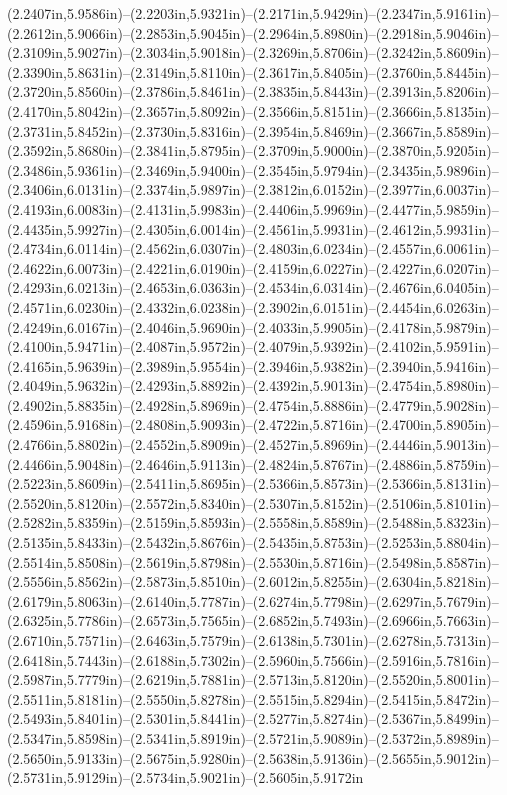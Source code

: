 (2.2407in,5.9586in)--(2.2203in,5.9321in)--(2.2171in,5.9429in)--(2.2347in,5.9161in)--(2.2612in,5.9066in)--(2.2853in,5.9045in)--(2.2964in,5.8980in)--(2.2918in,5.9046in)--(2.3109in,5.9027in)--(2.3034in,5.9018in)--(2.3269in,5.8706in)--(2.3242in,5.8609in)--(2.3390in,5.8631in)--(2.3149in,5.8110in)--(2.3617in,5.8405in)--(2.3760in,5.8445in)--(2.3720in,5.8560in)--(2.3786in,5.8461in)--(2.3835in,5.8443in)--(2.3913in,5.8206in)--(2.4170in,5.8042in)--(2.3657in,5.8092in)--(2.3566in,5.8151in)--(2.3666in,5.8135in)--(2.3731in,5.8452in)--(2.3730in,5.8316in)--(2.3954in,5.8469in)--(2.3667in,5.8589in)--(2.3592in,5.8680in)--(2.3841in,5.8795in)--(2.3709in,5.9000in)--(2.3870in,5.9205in)--(2.3486in,5.9361in)--(2.3469in,5.9400in)--(2.3545in,5.9794in)--(2.3435in,5.9896in)--(2.3406in,6.0131in)--(2.3374in,5.9897in)--(2.3812in,6.0152in)--(2.3977in,6.0037in)--(2.4193in,6.0083in)--(2.4131in,5.9983in)--(2.4406in,5.9969in)--(2.4477in,5.9859in)--(2.4435in,5.9927in)--(2.4305in,6.0014in)--(2.4561in,5.9931in)--(2.4612in,5.9931in)--(2.4734in,6.0114in)--(2.4562in,6.0307in)--(2.4803in,6.0234in)--(2.4557in,6.0061in)--(2.4622in,6.0073in)--(2.4221in,6.0190in)--(2.4159in,6.0227in)--(2.4227in,6.0207in)--(2.4293in,6.0213in)--(2.4653in,6.0363in)--(2.4534in,6.0314in)--(2.4676in,6.0405in)--(2.4571in,6.0230in)--(2.4332in,6.0238in)--(2.3902in,6.0151in)--(2.4454in,6.0263in)--(2.4249in,6.0167in)--(2.4046in,5.9690in)--(2.4033in,5.9905in)--(2.4178in,5.9879in)--(2.4100in,5.9471in)--(2.4087in,5.9572in)--(2.4079in,5.9392in)--(2.4102in,5.9591in)--(2.4165in,5.9639in)--(2.3989in,5.9554in)--(2.3946in,5.9382in)--(2.3940in,5.9416in)--(2.4049in,5.9632in)--(2.4293in,5.8892in)--(2.4392in,5.9013in)--(2.4754in,5.8980in)--(2.4902in,5.8835in)--(2.4928in,5.8969in)--(2.4754in,5.8886in)--(2.4779in,5.9028in)--(2.4596in,5.9168in)--(2.4808in,5.9093in)--(2.4722in,5.8716in)--(2.4700in,5.8905in)--(2.4766in,5.8802in)--(2.4552in,5.8909in)--(2.4527in,5.8969in)--(2.4446in,5.9013in)--(2.4466in,5.9048in)--(2.4646in,5.9113in)--(2.4824in,5.8767in)--(2.4886in,5.8759in)--(2.5223in,5.8609in)--(2.5411in,5.8695in)--(2.5366in,5.8573in)--(2.5366in,5.8131in)--(2.5520in,5.8120in)--(2.5572in,5.8340in)--(2.5307in,5.8152in)--(2.5106in,5.8101in)--(2.5282in,5.8359in)--(2.5159in,5.8593in)--(2.5558in,5.8589in)--(2.5488in,5.8323in)--(2.5135in,5.8433in)--(2.5432in,5.8676in)--(2.5435in,5.8753in)--(2.5253in,5.8804in)--(2.5514in,5.8508in)--(2.5619in,5.8798in)--(2.5530in,5.8716in)--(2.5498in,5.8587in)--(2.5556in,5.8562in)--(2.5873in,5.8510in)--(2.6012in,5.8255in)--(2.6304in,5.8218in)--(2.6179in,5.8063in)--(2.6140in,5.7787in)--(2.6274in,5.7798in)--(2.6297in,5.7679in)--(2.6325in,5.7786in)--(2.6573in,5.7565in)--(2.6852in,5.7493in)--(2.6966in,5.7663in)--(2.6710in,5.7571in)--(2.6463in,5.7579in)--(2.6138in,5.7301in)--(2.6278in,5.7313in)--(2.6418in,5.7443in)--(2.6188in,5.7302in)--(2.5960in,5.7566in)--(2.5916in,5.7816in)--(2.5987in,5.7779in)--(2.6219in,5.7881in)--(2.5713in,5.8120in)--(2.5520in,5.8001in)--(2.5511in,5.8181in)--(2.5550in,5.8278in)--(2.5515in,5.8294in)--(2.5415in,5.8472in)--(2.5493in,5.8401in)--(2.5301in,5.8441in)--(2.5277in,5.8274in)--(2.5367in,5.8499in)--(2.5347in,5.8598in)--(2.5341in,5.8919in)--(2.5721in,5.9089in)--(2.5372in,5.8989in)--(2.5650in,5.9133in)--(2.5675in,5.9280in)--(2.5638in,5.9136in)--(2.5655in,5.9012in)--(2.5731in,5.9129in)--(2.5734in,5.9021in)--(2.5605in,5.9172in